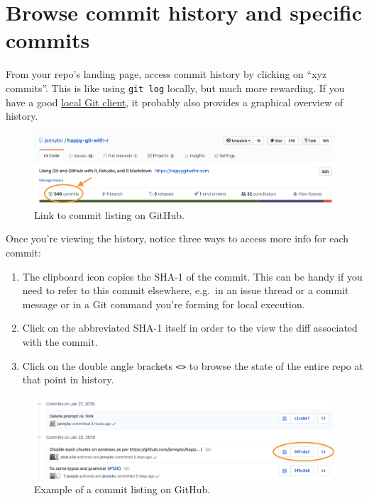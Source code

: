 \documentclass[
]{book}
\providecommand{\tightlist}{%
  \setlength{\itemsep}{0pt}\setlength{\parskip}{0pt}}
\begin{document}
\section{Browse commit history and specific commits}\label{browse-commit-history-and-specific-commits}

From your repo's landing page, access commit history by clicking on ``xyz commits''. This is like using \texttt{git\ log} locally, but much more rewarding. If you have a good \hyperref[git-client]{local Git client}, it probably also provides a graphical overview of history.

\begin{figure}
\includegraphics[width=1\linewidth]{img/screenshots/github-link-to-commits} \caption{Link to commit listing on GitHub.}\label{fig:github-link-to-commit-listing}
\end{figure}

Once you're viewing the history, notice three ways to access more info for each commit:

\begin{enumerate}
\def\labelenumi{\arabic{enumi}.}
\tightlist
\item
  The clipboard icon copies the SHA-1 of the commit. This can be handy if you need to refer to this commit elsewhere, e.g.~in an issue thread or a commit message or in a Git command you're forming for local execution.
\item
  Click on the abbreviated SHA-1 itself in order to the view the diff associated with the commit.
\item
  Click on the double angle brackets \texttt{\textless{}\textgreater{}} to browse the state of the entire repo at that point in history.
\end{enumerate}

\begin{figure}
\includegraphics[width=1\linewidth]{img/screenshots/github-commit-listing} \caption{Example of a commit listing on GitHub.}\label{fig:github-commit-listing}
\end{figure}
\end{document}
